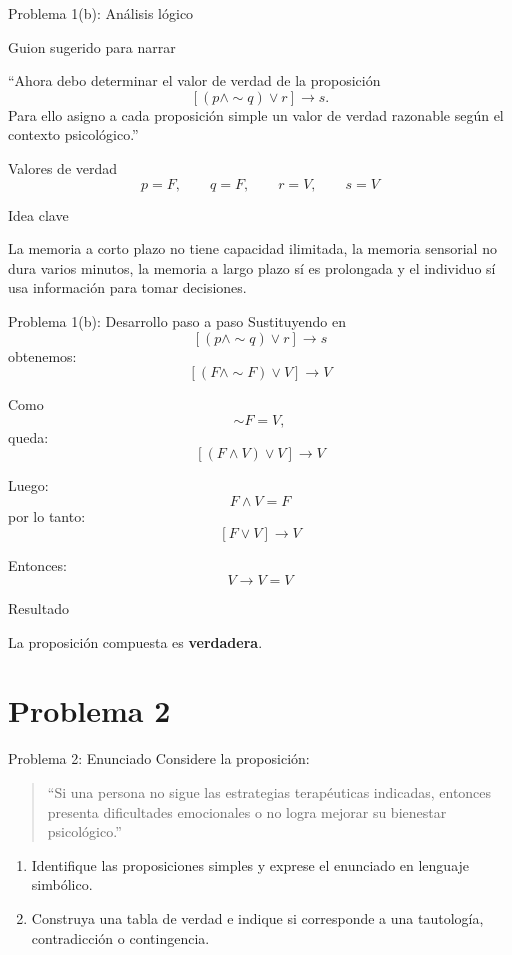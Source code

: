 \documentclass[aspectratio=169,10pt]{beamer}
\newcommand{\IdeaClave}[1]{
	\begin{alertblock}{Idea clave}
		#1
	\end{alertblock}
}
\newcommand{\Guion}[1]{
	\begin{exampleblock}{Guion sugerido para narrar}
		#1
	\end{exampleblock}
}
\newcommand{\Resultado}[1]{
	\begin{block}{Resultado}
		#1
	\end{block}
}
\begin{document}
	\begin{frame}{Problema 1(b): Análisis lógico}
		\Guion{
			``Ahora debo determinar el valor de verdad de la proposición
			\[
			[(p\land \sim q)\lor r]\to s.
			\]
			Para ello asigno a cada proposición simple un valor de verdad razonable según el contexto psicológico.''}
		
		\begin{block}{Valores de verdad}
			\[
			p=F,\qquad q=F,\qquad r=V,\qquad s=V
			\]
		\end{block}
		
		\IdeaClave{
			La memoria a corto plazo no tiene capacidad ilimitada, la memoria sensorial no dura varios minutos, la memoria a largo plazo sí es prolongada y el individuo sí usa información para tomar decisiones.
		}
	\end{frame}
	
	\begin{frame}{Problema 1(b): Desarrollo paso a paso}
		Sustituyendo en
		\[
		[(p\land \sim q)\lor r]\to s
		\]
		obtenemos:
		\[
		[(F\land \sim F)\lor V]\to V
		\]
		
		Como
		\[
		\sim F = V,
		\]
		queda:
		\[
		[(F\land V)\lor V]\to V
		\]
		
		Luego:
		\[
		F\land V = F
		\]
		por lo tanto:
		\[
		[F\lor V]\to V
		\]
		
		Entonces:
		\[
		V\to V = V
		\]
		
		\Resultado{
			La proposición compuesta es \textbf{verdadera}.
		}
	\end{frame}
	
	\section{Problema 2}
	
	\begin{frame}{Problema 2: Enunciado}
		Considere la proposición:
		
		\begin{quote}
			``Si una persona no sigue las estrategias terapéuticas indicadas, entonces presenta dificultades emocionales o no logra mejorar su bienestar psicológico.''
		\end{quote}
		
		\begin{enumerate}[label=\alph*)]
			\item Identifique las proposiciones simples y exprese el enunciado en lenguaje simbólico.
			\item Construya una tabla de verdad e indique si corresponde a una tautología, contradicción o contingencia.
		\end{enumerate}
	\end{frame}
	
\end{document}

